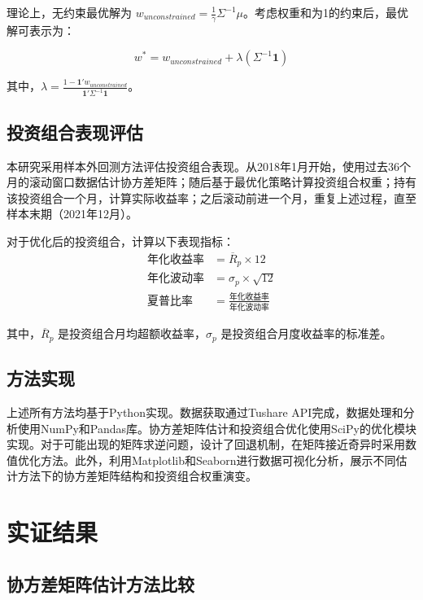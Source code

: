 \documentclass[12pt, a4paper]{article}
\begin{document}
理论上，无约束最优解为 $w_{unconstrained} = \frac{1}{\gamma} \Sigma^{-1} \mu$。考虑权重和为1的约束后，最优解可表示为：

\begin{equation}
w^* = w_{unconstrained} + \lambda (\Sigma^{-1} \textbf{1})
\end{equation}

其中，$\lambda = \frac{1 - \textbf{1}' w_{unconstrained}}{\textbf{1}' \Sigma^{-1} \textbf{1}}$。

\subsection{投资组合表现评估}
本研究采用样本外回测方法评估投资组合表现。从2018年1月开始，使用过去36个月的滚动窗口数据估计协方差矩阵；随后基于最优化策略计算投资组合权重；持有该投资组合一个月，计算实际收益率；之后滚动前进一个月，重复上述过程，直至样本末期（2021年12月）。

对于优化后的投资组合，计算以下表现指标：
\begin{equation}
\begin{aligned}
\text{年化收益率} &= \overline{R}_p \times 12 \\
\text{年化波动率} &= \sigma_p \times \sqrt{12} \\
\text{夏普比率} &= \frac{\text{年化收益率}}{\text{年化波动率}}
\end{aligned}
\end{equation}

其中，$\overline{R}_p$ 是投资组合月均超额收益率，$\sigma_p$ 是投资组合月度收益率的标准差。

\subsection{方法实现}
上述所有方法均基于Python实现。数据获取通过Tushare API完成，数据处理和分析使用NumPy和Pandas库。协方差矩阵估计和投资组合优化使用SciPy的优化模块实现。对于可能出现的矩阵求逆问题，设计了回退机制，在矩阵接近奇异时采用数值优化方法。此外，利用Matplotlib和Seaborn进行数据可视化分析，展示不同估计方法下的协方差矩阵结构和投资组合权重演变。

\section{实证结果}

\subsection{协方差矩阵估计方法比较}
\end{document}
